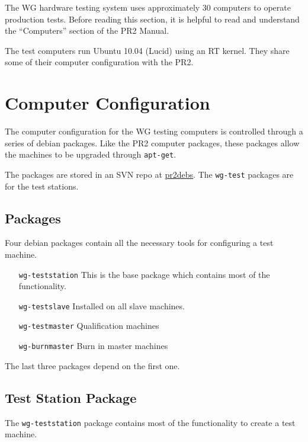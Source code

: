 \documentclass[11pt]{book}
\begin{document}
The WG hardware testing system uses approximately 30 computers to operate production tests. Before reading this section, it is helpful to read and understand the ``Computers'' section of the PR2 Manual.

The test computers run Ubuntu 10.04 (Lucid) using an RT kernel. They share some of their computer configuration with the PR2.

\section{Computer Configuration}

The computer configuration for the WG testing computers is controlled through a series of debian packages. Like the PR2 computer packages, these packages allow the machines to be upgraded through \texttt{apt-get}.

The packages are stored in an SVN repo at \href{https://code.ros.org/svn/pr2debs/trunk}{pr2debs}. The \texttt{wg-test} packages are for the test stations.

\subsection{Packages}

Four debian packages contain all the necessary tools for configuring a test machine. 

\begin{itemize}
\item [\texttt{wg-teststation}] This is the base package which contains most of the functionality.
\item [\texttt{wg-testslave}] Installed on all slave machines.
\item [\texttt{wg-testmaster}] Qualification machines
\item [\texttt{wg-burnmaster}] Burn in master machines
\end{itemize}

The last three packages depend on the first one. 

\subsection{Test Station Package}

The \texttt{wg-teststation} package contains most of the functionality to create a test machine.
\end{document}
